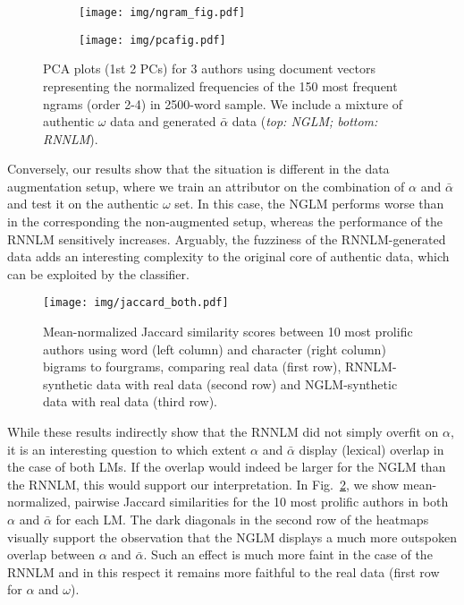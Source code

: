 \documentclass[11pt]{article}
\begin{document}
\begin{figure}[ht]
\centering
\begin{subfigure}{9cm}
	\centering\hspace*{-2cm}
	\texttt{[image: img/ngram\_fig.pdf]}
\end{subfigure}

\begin{subfigure}{9cm}
	\centering\hspace*{-2cm}
	\texttt{[image: img/pcafig.pdf]}
    \end{subfigure}
    \caption{PCA plots (1st 2 PCs) for 3 authors using document vectors representing the normalized frequencies of the 150 most frequent ngrams (order 2-4) in 2500-word sample. We include a mixture of authentic $\omega$ data and generated $\bar{\alpha}$ data (\emph{top: NGLM; bottom: RNNLM}).}
    \label{fig:pca}
\end{figure}

Conversely, our results show that the situation is different in the data augmentation setup, where we train an attributor on the combination of $\alpha$ and $\bar{\alpha}$ and test it on the authentic $\omega$ set. In this case, the NGLM performs worse than in the corresponding the non-augmented setup, whereas the performance of the RNNLM sensitively increases. Arguably, the fuzziness of the RNNLM-generated data adds an interesting complexity to the original core of authentic data, which can be exploited by the classifier.

\begin{figure}[h!]
    \hspace*{-0.5cm}
    \texttt{[image: img/jaccard\_both.pdf]}
    \caption{
	Mean-normalized Jaccard similarity scores between 10 most prolific authors using word (left column) and character (right column) bigrams to fourgrams, comparing real data (first row), RNNLM-synthetic data with real data (second row) and NGLM-synthetic data with real data (third row).
    }
    \label{fig:jaccard}
\end{figure}

While these results indirectly show that the RNNLM did not simply overfit on $\alpha$, it is an interesting question to which extent $\alpha$ and $\bar{\alpha}$ display (lexical) overlap in the case of both LMs. If the overlap would indeed be larger for the NGLM than the RNNLM, this would support our interpretation. In Fig.~\ref{fig:jaccard}, we show mean-normalized, pairwise Jaccard similarities for the 10 most prolific authors in both $\alpha$ and $\bar{\alpha}$ for each LM. The dark diagonals in the second row of the heatmaps visually support the observation that the NGLM displays a much more outspoken overlap between $\alpha$ and $\bar{\alpha}$. Such an effect is much more faint in the case of the RNNLM and in this respect it remains more faithful to the real data (first row for $\alpha$ and $\omega$).
\end{document}
